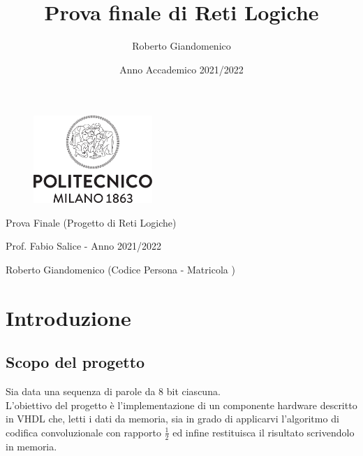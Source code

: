 \documentclass{article}
\title{Prova finale di Reti Logiche}
\author{Roberto Giandomenico}
\date{Anno Accademico 2021/2022}
\begin{document}
\thispagestyle{empty} 
\begin{titlepage}

    \begin{figure}[h]
        \vspace{5pt}
        \centering
        \includegraphics[width=0.4\textwidth]{Resources/logo_polimi.png}
        \label{fig:logo_polimi}
        \vspace{5pt}
    \end{figure}

    \begin{center}
       \vspace*{5cm}
       {\huge Prova Finale (Progetto di Reti Logiche)}
       \vspace{1cm}
        \begin{large}   
        
            {Prof. Fabio Salice - Anno 2021/2022}
           \vspace{11cm}
            
            {Roberto Giandomenico (Codice Persona  - Matricola )}
           \vspace{2cm}
           
        \end{large}
   \end{center}
\end{titlepage}
\tableofcontents
\pagebreak



\section{Introduzione} \label{subsection-introduz}

\subsection{Scopo del progetto}
Sia data una sequenza di parole da 8 bit ciascuna.\\
L’obiettivo del progetto è l’implementazione di un componente hardware descritto in VHDL che, letti i dati da memoria, sia in grado di applicarvi l’algoritmo di codifica convoluzionale con rapporto \(\frac{1}{2}\) ed infine restituisca il risultato scrivendolo in memoria.
\end{document}
